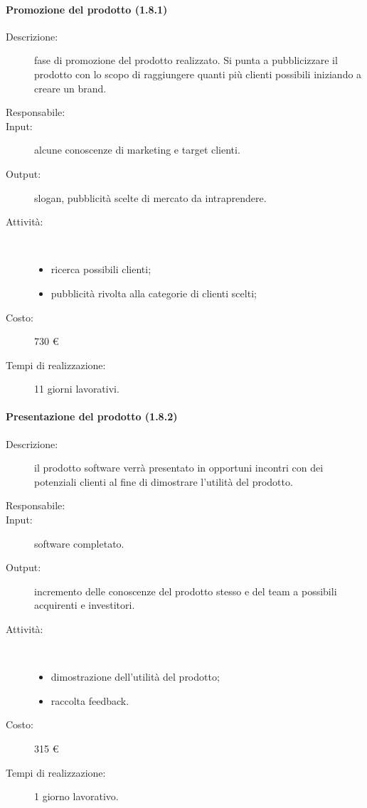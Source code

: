 \paragraph{Promozione del prodotto (1.8.1)}
\begin{description}
\item[Descrizione:] fase di promozione del prodotto realizzato. Si punta a pubblicizzare il prodotto con lo scopo di raggiungere quanti più clienti possibili iniziando a creare un brand.
\item[Responsabile:] 
\item[Input:] alcune conoscenze di marketing e target clienti.
\item[Output:] slogan, pubblicità scelte di mercato da intraprendere.
\item[Attività:]\mbox{}\\[-1.5\baselineskip]
	\begin{itemize}
	\item ricerca possibili clienti;
	\item pubblicità rivolta alla categorie di clienti scelti;
	\end{itemize}
\item[Costo:] 730 \euro{}
\item[Tempi di realizzazione:] 11 giorni lavorativi.
\end{description}

\paragraph{Presentazione del prodotto (1.8.2)}
\begin{description}
\item[Descrizione:] il prodotto software verrà presentato in opportuni incontri con dei potenziali clienti al fine di dimostrare l'utilità del prodotto.
\item[Responsabile:] 
\item[Input:] software completato.
\item[Output:] incremento delle conoscenze del prodotto stesso e del team a possibili acquirenti e investitori. 
\item[Attività:]\mbox{}\\[-1.5\baselineskip]
	\begin{itemize}
	\item dimostrazione dell'utilità del prodotto;
	\item raccolta feedback.
	\end{itemize}
\item[Costo:] 315 \euro{}
\item[Tempi di realizzazione:] 1 giorno lavorativo.
\end{description}
